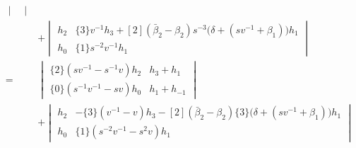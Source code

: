 \begin{example}
\begin{align*}
\begin{vmatrix}
\end{vmatrix}\\
&+
\begin{vmatrix}
h_2 & \{3\} v^{-1} h_{3} + [2] ( \bar{\beta}_2 - \beta_2 ) s^{-3} \big( \delta + ( s v^{-1} + \beta_{1} ) \big) h_{1} \\
h_0 & \{1\} s^{-2} v^{-1} h_{1}
\end{vmatrix} \\
=& 
\begin{vmatrix}
\{2\} ( s v^{-1} - s^{-1} v ) h_2 &  h_3 + h_1 \\
\{0\} ( s^{-1} v^{-1} - s v ) h_0 & h_1 + h_{-1}
\end{vmatrix}\\
&+
\begin{vmatrix}
h_2 & - \{3\} ( v^{-1} - v ) h_3 - [2] ( \bar{\beta}_2 - \beta_2 ) \{3\} \big( \delta + (s v^{-1} + \beta_{1} ) \big) h_1 \\
h_0 & \{1\} ( s^{-2} v^{-1} - s^2 v ) h_{1}
\end{vmatrix} 
\end{align*}
\end{example}

